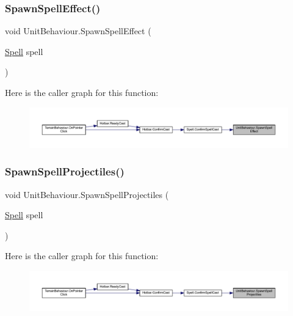\subsubsection{\texorpdfstring{SpawnSpellEffect()}{SpawnSpellEffect()}}
{\footnotesize\ttfamily void Unit\+Behaviour.\+Spawn\+Spell\+Effect (\begin{DoxyParamCaption}\item[{\mbox{\hyperlink{class_spell}{Spell}}}]{spell }\end{DoxyParamCaption})}

Here is the caller graph for this function\+:\nopagebreak
\begin{figure}[H]
\begin{center}
\leavevmode
\includegraphics[width=350pt]{class_unit_behaviour_a558929aaa9173e1a3b9dfecd8674660f_icgraph}
\end{center}
\end{figure}
\mbox{\label{class_unit_behaviour_a2eee29cede96c8d2aa45e89eda7c0c3c}} 
\subsubsection{\texorpdfstring{SpawnSpellProjectiles()}{SpawnSpellProjectiles()}}
{\footnotesize\ttfamily void Unit\+Behaviour.\+Spawn\+Spell\+Projectiles (\begin{DoxyParamCaption}\item[{\mbox{\hyperlink{class_spell}{Spell}}}]{spell }\end{DoxyParamCaption})}

Here is the caller graph for this function\+:\nopagebreak
\begin{figure}[H]
\begin{center}
\leavevmode
\includegraphics[width=350pt]{class_unit_behaviour_a2eee29cede96c8d2aa45e89eda7c0c3c_icgraph}
\end{center}
\end{figure}
\mbox{\label{class_unit_behaviour_a7e978454f207985987f6088c037b9c5f}} 
